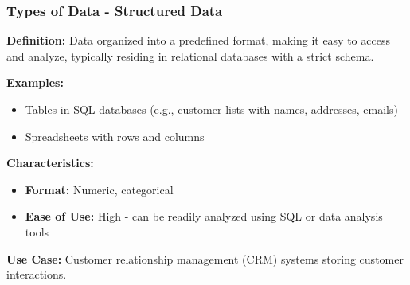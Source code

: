 \documentclass[aspectratio=169]{beamer}
\begin{document}
\begin{frame}[fragile]
    \frametitle{Types of Data - Structured Data}
    \textbf{Definition:} Data organized into a predefined format, making it easy to access and analyze, typically residing in relational databases with a strict schema.
    
    \textbf{Examples:}
    \begin{itemize}
        \item Tables in SQL databases (e.g., customer lists with names, addresses, emails)
        \item Spreadsheets with rows and columns
    \end{itemize}
    
    \textbf{Characteristics:}
    \begin{itemize}
        \item \textbf{Format:} Numeric, categorical
        \item \textbf{Ease of Use:} High - can be readily analyzed using SQL or data analysis tools
    \end{itemize}
    
    \textbf{Use Case:} Customer relationship management (CRM) systems storing customer interactions.
\end{frame}
\end{document}
